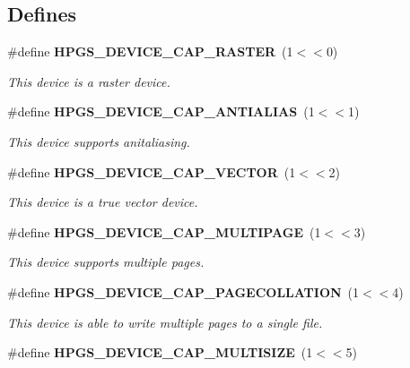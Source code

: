 \subsection*{Defines}
\begin{CompactItemize}
\item 
\#define {\bf HPGS\_\-DEVICE\_\-CAP\_\-RASTER}~(1$<$$<$0)\label{group__device_g8175e4398fb6e52394c50e931f8cf693}

\begin{CompactList}\small\item\em This device is a raster device. \item\end{CompactList}\item 
\#define {\bf HPGS\_\-DEVICE\_\-CAP\_\-ANTIALIAS}~(1$<$$<$1)\label{group__device_gbfbaca61af5c0e6faef1ad7a562f3329}

\begin{CompactList}\small\item\em This device supports anitaliasing. \item\end{CompactList}\item 
\#define {\bf HPGS\_\-DEVICE\_\-CAP\_\-VECTOR}~(1$<$$<$2)\label{group__device_g83df9d5e409b8b6c76d218cac0a6e0a1}

\begin{CompactList}\small\item\em This device is a true vector device. \item\end{CompactList}\item 
\#define {\bf HPGS\_\-DEVICE\_\-CAP\_\-MULTIPAGE}~(1$<$$<$3)\label{group__device_ge56cf76d457f9ee8dd758b10d6bd10e5}

\begin{CompactList}\small\item\em This device supports multiple pages. \item\end{CompactList}\item 
\#define {\bf HPGS\_\-DEVICE\_\-CAP\_\-PAGECOLLATION}~(1$<$$<$4)\label{group__device_g47c1e796774cc9019de505639ba2d8b4}

\begin{CompactList}\small\item\em This device is able to write multiple pages to a single file. \item\end{CompactList}\item 
\#define {\bf HPGS\_\-DEVICE\_\-CAP\_\-MULTISIZE}~(1$<$$<$5)\label{group__device_g74b3043329761f6c48088374cb2645d0}


\end{CompactItemize}
